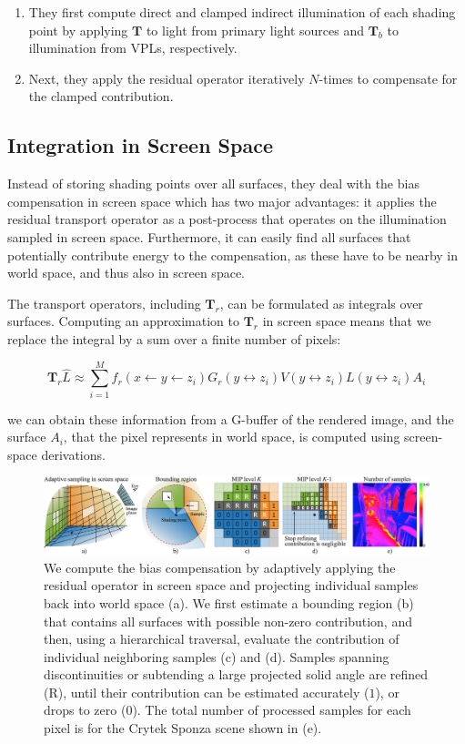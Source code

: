 \begin{enumerate}
	\item They first compute direct and clamped indirect illumination of each shading point by applying $\mathbf{T}$ to light from primary light sources and $\mathbf{T}_b$ to illumination from VPLs, respectively.
	\item Next, they apply the residual operator iteratively $N$-times to compensate for the clamped contribution.
\end{enumerate}




\subsection{Integration in Screen Space}
Instead of storing shading points over all surfaces, they deal with the bias compensation in screen space which has two major advantages: it applies the residual transport operator as a post-process that operates on the illumination sampled in screen space. Furthermore, it can easily find all surfaces that potentially contribute energy to the compensation, as these have to be nearby in world space, and thus also in screen space.

The transport operators, including $\mathbf{T}_r$, can be formulated as integrals over surfaces. Computing an approximation to $\mathbf{T}_r$ in screen space means that we replace the integral by a sum over a finite number of pixels:

\begin{equation*}
	\mathbf{T}_r\hat{L}\approx\sum^{M}_{i=1}f_r(x\leftarrow y\leftarrow z_i)G_r(y\leftrightarrow z_i)V(y\leftrightarrow z_i)L(y\leftrightarrow z_i)A_i
\end{equation*}

we can obtain these information from a G-buffer of the rendered image, and the surface $A_i$, that the pixel represents in world space, is computed using screen-space derivations.

\begin{figure}\label{f:ssbc-2}
	\begin{center}
		\includegraphics[width=1.\textwidth]{graphics/ir/ir-6-1}
	\end{center}
	\caption{We compute the bias compensation by adaptively applying the residual operator in screen space and projecting individual samples back into world space (a). We first estimate a bounding region (b) that contains all surfaces with possible non-zero contribution, and then, using a hierarchical traversal, evaluate the contribution of individual neighboring samples (c) and (d). Samples spanning discontinuities or subtending a large projected solid angle are refined (R), until their contribution can be estimated accurately ($1$), or drops to zero ($0$). The total number of processed samples for each pixel is for the Crytek Sponza scene shown in (e).}
\end{figure}

